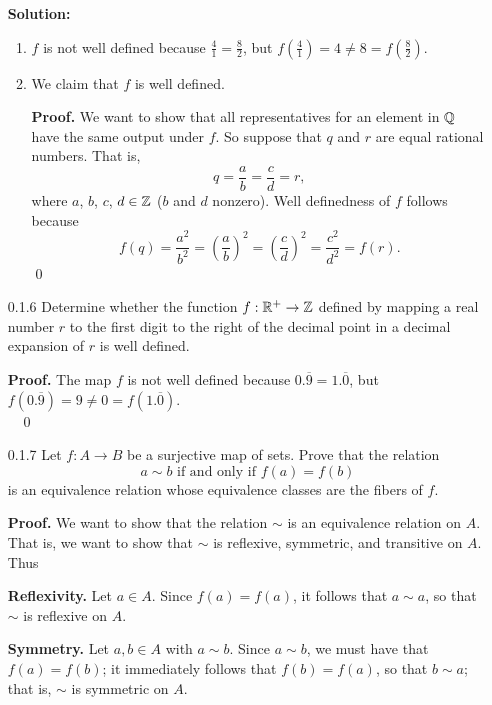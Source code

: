 \begin{enumerate}
      \textbf{Solution:}
         \begin{enumerate}
            \item $f$ is not well defined because $\frac{4}{1} = \frac{8}{2}$, 
                  but $f\left(\frac{4}{1}\right) = 4 \neq 8 =
                  f\left(\frac{8}{2}\right)$.
            \item We claim that $f$ is well defined.

                  \textbf{Proof.} We want to show that all representatives for 
                  an element in $\mathbb{Q}$ have the same output under $f$. So suppose
                  that $q$ and $r$ are equal rational numbers. That is,
                  $$q = \frac{a}{b} = \frac{c}{d} = r,$$
                  where $a$, $b$, $c$, $d \in \mathbb{Z}$ ($b$ and $d$ nonzero). Well
                  definedness of $f$ follows because
                  $$f(q) = \frac{a^2}{b^2} = \left(\frac{a}{b}\right)^2 =
                    \left(\frac{c}{d}\right)^2 = \frac{c^2}{d^2} = f(r).$$ \qed
         \end{enumerate}
   \item[0.1.6] Determine whether the function $f: \mathbb{R}^+ \rightarrow \mathbb{Z}$ defined
                by mapping a real number $r$ to the first digit to the right of
                the decimal point in a decimal expansion of $r$ is well defined.

      \textbf{Proof.} The map $f$ is not well defined because
      $0.\overline{9} = 1.\overline{0}$, but
      $f(0.\overline{9}) = 9 \neq 0 = f(1.\overline{0})$. \\ \mbox{ } \qed
   \item[0.1.7] Let $f : A \rightarrow B$ be a surjective map of sets. Prove
                that the relation
                $$a \sim b \mbox{ if and only if } f(a) = f(b)$$
                is an equivalence relation whose equivalence classes are the
                fibers of $f$.

      \textbf{Proof.} We want to show that the relation $\sim$ is an equivalence
      relation on $A$. That is, we want to show that $\sim$ is reflexive,
      symmetric, and transitive on $A$. Thus

      \textbf{Reflexivity.} Let $a \in A$. Since $f(a) = f(a)$, it follows that 
      $a \sim a$, so that $\sim$ is reflexive on $A$.

      \textbf{Symmetry.} Let $a, b \in A$ with $a \sim b$. Since $a \sim b$, we 
      must have that $f(a) = f(b)$; it immediately follows that $f(b) = f(a)$, 
      so that $b \sim a$; that is, $\sim$ is symmetric on $A$.


\end{enumerate}
